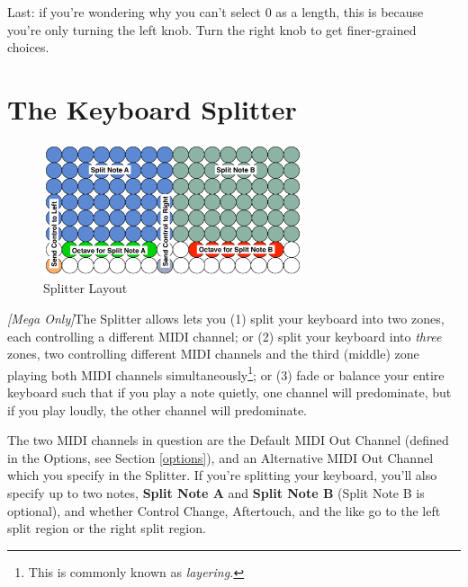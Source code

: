 \documentclass{article}
\begin{document}
Last: if you're wondering why you can't select 0 as a length, this is because you're only turning the left knob.  Turn the right knob to get finer-grained choices.


\clearpage

\section {The Keyboard Splitter}
\label{splitter}

\begin{figure}
\vspace{-1.5em}\includegraphics[width=3in]{split}
\vspace{-2em}\caption{\small Splitter Layout}
\label{splitter}
\end{figure}

\textit{[Mega Only]}\qquad The Splitter allows lets you (1) split your keyboard into two zones, each controlling a different MIDI channel; or (2) split your keyboard into {\it three} zones, two controlling different MIDI channels and the third (middle) zone playing both MIDI channels simultaneously\footnote{This is commonly known as {\it layering.}}; or (3) fade or balance your entire keyboard such that if you play a note quietly, one channel will predominate, but if you play loudly, the other channel will predominate.

The two MIDI channels in question are the Default MIDI Out Channel (defined in the Options, see Section \ref{options}), and an Alternative MIDI Out Channel which you specify in the Splitter.  If you're splitting your keyboard, you'll also specify up to two notes, {\bf Split Note A} and {\bf Split Note B}  (Split Note B is optional), and whether Control Change, Aftertouch, and the like go to the left split region or the right split region.
\end{document}
